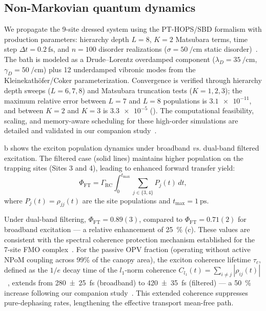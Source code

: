 \documentclass[12pt]{iopart}
\begin{document}
\subsection{Non-Markovian quantum dynamics}

We propagate the 9-site dressed system using the PT-HOPS/SBD formalism with production parameters: hierarchy depth $L=8$, $K=2$ Matsubara terms, time step $\Delta t = \qty{0.2}{\fs}$, and $n=100$ disorder realizations ($\sigma = \qty{50}{\per\cm}$ static disorder)~\cite{Varvelo2021,Citty2024}.
The bath is modeled as a Drude--Lorentz overdamped component ($\lambda_D = \qty{35}{\per\cm}$, $\gamma_D = \qty{50}{\per\cm}$) plus 12 underdamped vibronic modes from the Kleinekath\"{o}fer/Coker parameterization.
Convergence is verified through hierarchy depth sweeps ($L=6,7,8$) and Matsubara truncation tests ($K=1,2,3$); the maximum relative error between $L=7$ and $L=8$ populations is $\num{3.1e-11}$, and between $K=2$ and $K=3$ is $\num{3.3e-5}$ (). The computational feasibility, scaling, and memory-aware scheduling for these high-order simulations are detailed and validated in our companion study~\cite{Kouam2026}.

b shows the exciton population dynamics under broadband \emph{vs.} dual-band filtered excitation.
The filtered case (solid lines) maintains higher population on the trapping sites (Sites 3 and 4), leading to enhanced forward transfer yield:
\begin{equation}
\Phi_{\mathrm{FT}} = \Gamma_{\mathrm{RC}} \int_0^{t_{\mathrm{max}}} \sum_{j \in \{3,4\}} P_j(t)\,dt,
\label{eq:phi_ft}
\end{equation}
where $P_j(t) = \rho_{jj}(t)$ are the site populations and $t_{\mathrm{max}} = \qty{1}{\ps}$.

Under dual-band filtering, $\Phi_{\mathrm{FT}} = 0.89(3)$, compared to $\Phi_{\mathrm{FT}} = 0.71(2)$ for broadband excitation --- a relative enhancement of \qty{25}{\percent} (c). These values are consistent with the spectral coherence protection mechanism established for the 7-site FMO complex~\cite{Kouam2026}.
For the passive OPV fraction (operating without active NPoM coupling across 99\% of the canopy area), the exciton coherence lifetime $\tau_c$, defined as the $1/e$ decay time of the $l_1$-norm coherence $C_{l_1}(t) = \sum_{i\neq j} |\rho_{ij}(t)|$~\cite{Baumgratz2014}, extends from \qty{280(25)}{\fs} (broadband) to \qty{420(35)}{\fs} (filtered) --- a \qty{50}{\percent} increase following our companion study~\cite{Kouam2026}. This extended coherence suppresses pure-dephasing rates, lengthening the effective transport mean-free path.
\end{document}
